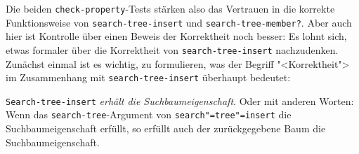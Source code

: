 Die beiden \texttt{check-property}-Tests stärken also das Vertrauen in
die korrekte Funktionsweise von \texttt{search-tree-insert} und
\texttt{search-tree-member?}.  Aber auch hier ist Kontrolle über einen
Beweis der Korrektheit noch besser:
Es lohnt sich, etwas formaler über die
Korrektheit von \texttt{search-tree-insert} nachzudenken.  Zunächst
einmal ist es wichtig, zu formulieren, was der Begriff "<Korrektheit">
im Zusammenhang mit \texttt{search-tree-insert} überhaupt bedeutet:
%
\begin{satz}\label{satz:suchbaum}
  \texttt{Search-tree-insert} \emph{erhält die Suchbaumeigenschaft}.
  Oder mit anderen Worten: Wenn das \texttt{search-tree}-Argument von
  \texttt{search"=tree"=insert} die Suchbaumeigenschaft erfüllt, so
  erfüllt auch der zurückgegebene Baum die Suchbaumeigenschaft.
\end{satz}
%
